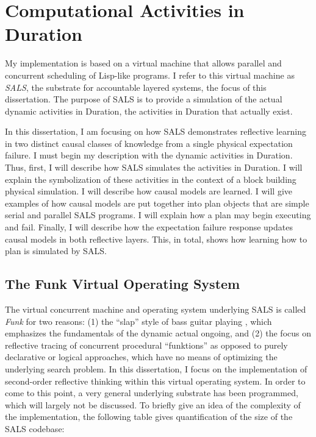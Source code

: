 \chapter{Computational Activities in Duration}
\label{chapter:computational_activities_in_duration}


My implementation is based on a virtual machine that allows parallel
and concurrent scheduling of Lisp-like programs.  I refer to this
virtual machine as \emph{SALS}, the substrate for accountable layered
systems, the focus of this dissertation.  The purpose of SALS is to
provide a simulation of the actual dynamic activities in Duration, the
activities in Duration that actually exist.

In this dissertation, I am focusing on how SALS demonstrates
reflective learning in two distinct causal classes of knowledge from a
single physical expectation failure.  I must begin my description with
the dynamic activities in Duration.  Thus, first, I will describe how
SALS simulates the activities in Duration.  I will explain the
symbolization of these activities in the context of a block building
physical simulation.  I will describe how causal models are learned.
I will give examples of how causal models are put together into plan
objects that are simple serial and parallel SALS programs.  I will
explain how a plan may begin executing and fail.  Finally, I will
describe how the expectation failure response updates causal models in
both reflective layers.  This, in total, shows how learning how to
plan is simulated by SALS.

\section{The Funk Virtual Operating System}

The virtual concurrent machine and operating system underlying SALS is
called \emph{Funk} for two reasons: (1) the ``slap'' style of bass
guitar playing \cite[]{graham:1969, johnson:1984}, which emphasizes
the fundamentals of the dynamic actual ongoing, and (2) the focus on
reflective tracing of concurrent procedural ``funktions'' as opposed
to purely declarative or logical approaches, which have no means of
optimizing the underlying search problem.  In this dissertation, I
focus on the implementation of second-order reflective thinking within
this virtual operating system.  In order to come to this point, a very
general underlying substrate has been programmed, which will largely
not be discussed.  To briefly give an idea of the complexity of the
implementation, the following table gives quantification of the size
of the SALS codebase:

